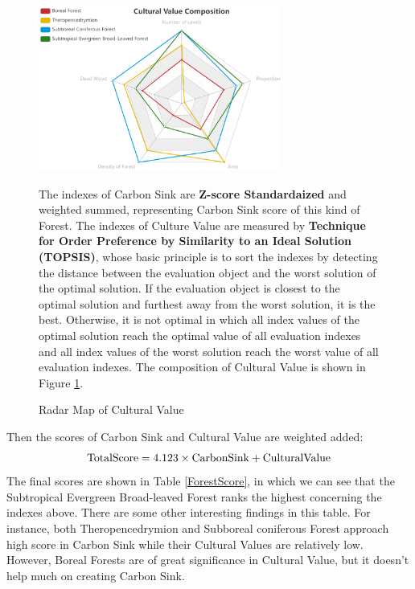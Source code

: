 \documentclass{mcmthesis}
\numberwithin{figure}{section}
\numberwithin{table}{section}
\numberwithin{equation}{section}
\begin{document}
\begin{figure}[ht]

  \hfill
  \begin{minipage}[htbp]{0.47\linewidth}
    \begin{flushleft}
      \includegraphics[width = 8cm]{code&pic/Cultural Value Composition.png}
      \caption{Radar Map of Cultural Value}\label{Radar}
    \end{flushleft}
  \end{minipage}
    \begin{minipage}[htbp]{0.45\linewidth}
      The indexes of Carbon Sink are \textbf{Z-score Standardaized} and weighted summed, representing
      Carbon Sink score of this kind of Forest. The indexes of Culture Value are 
      measured by \textbf{Technique for Order Preference by Similarity to an Ideal Solution (TOPSIS)}, 
      whose basic principle is to sort the indexes by detecting the distance between the 
      evaluation object and the worst solution of the optimal solution.  
      If the evaluation object is closest to the optimal solution and furthest 
      away from the worst solution, it is the best. Otherwise, it is not optimal 
      in which all index values of the optimal solution reach the optimal value 
      of all evaluation indexes and all index values of the worst solution reach 
      the worst value of all evaluation indexes. The composition of Cultural Value
      is shown in Figure \ref{Radar}.
  \end{minipage}
\end{figure}


\par
Then the scores of Carbon Sink and Cultural Value are weighted added: 
$$
  \rm{TotalScore} = 4.123\times \rm{CarbonSink} + \rm{Cultural Value}
$$ 
The final scores are shown in Table \ref{ForestScore}, in which we can see that the 
Subtropical Evergreen Broad-leaved Forest ranks the highest concerning the indexes above.
There are some other interesting findings in this table. For instance, both
Theropencedrymion and Subboreal coniferous Forest approach high score in Carbon Sink while 
their Cultural Values are relatively low. However, Boreal Forests are of great
significance in Cultural Value, but it doesn't help much on creating Carbon Sink. 
\end{document}
